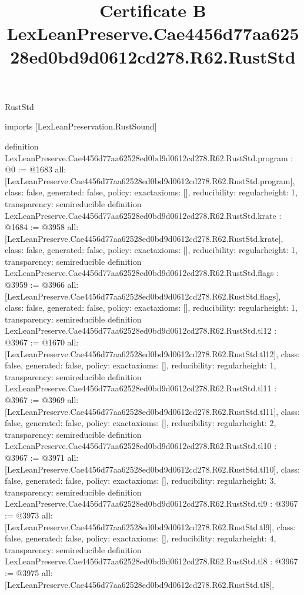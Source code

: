\begin{lexlean}{RustStd}
\title{Certificate B LexLeanPreserve.Cae4456d77aa62528ed0bd9d0612cd278.R62.RustStd}
\begin{coremodule}
imports [LexLeanPreservation.RustSound]

definition LexLeanPreserve.Cae4456d77aa62528ed0bd9d0612cd278.R62.RustStd.program : @0 := @1683 {
  all: [LexLeanPreserve.Cae4456d77aa62528ed0bd9d0612cd278.R62.RustStd.program],
  class: false,
  generated: false,
  policy: exact{axioms: []},
  reducibility: regular{height: 1},
  transparency: semireducible
}
definition LexLeanPreserve.Cae4456d77aa62528ed0bd9d0612cd278.R62.RustStd.krate : @1684 := @3958 {
  all: [LexLeanPreserve.Cae4456d77aa62528ed0bd9d0612cd278.R62.RustStd.krate],
  class: false,
  generated: false,
  policy: exact{axioms: []},
  reducibility: regular{height: 1},
  transparency: semireducible
}
definition LexLeanPreserve.Cae4456d77aa62528ed0bd9d0612cd278.R62.RustStd.flags : @3959 := @3966 {
  all: [LexLeanPreserve.Cae4456d77aa62528ed0bd9d0612cd278.R62.RustStd.flags],
  class: false,
  generated: false,
  policy: exact{axioms: []},
  reducibility: regular{height: 1},
  transparency: semireducible
}
definition LexLeanPreserve.Cae4456d77aa62528ed0bd9d0612cd278.R62.RustStd.tl12 : @3967 := @1670 {
  all: [LexLeanPreserve.Cae4456d77aa62528ed0bd9d0612cd278.R62.RustStd.tl12],
  class: false,
  generated: false,
  policy: exact{axioms: []},
  reducibility: regular{height: 1},
  transparency: semireducible
}
definition LexLeanPreserve.Cae4456d77aa62528ed0bd9d0612cd278.R62.RustStd.tl11 : @3967 := @3969 {
  all: [LexLeanPreserve.Cae4456d77aa62528ed0bd9d0612cd278.R62.RustStd.tl11],
  class: false,
  generated: false,
  policy: exact{axioms: []},
  reducibility: regular{height: 2},
  transparency: semireducible
}
definition LexLeanPreserve.Cae4456d77aa62528ed0bd9d0612cd278.R62.RustStd.tl10 : @3967 := @3971 {
  all: [LexLeanPreserve.Cae4456d77aa62528ed0bd9d0612cd278.R62.RustStd.tl10],
  class: false,
  generated: false,
  policy: exact{axioms: []},
  reducibility: regular{height: 3},
  transparency: semireducible
}
definition LexLeanPreserve.Cae4456d77aa62528ed0bd9d0612cd278.R62.RustStd.tl9 : @3967 := @3973 {
  all: [LexLeanPreserve.Cae4456d77aa62528ed0bd9d0612cd278.R62.RustStd.tl9],
  class: false,
  generated: false,
  policy: exact{axioms: []},
  reducibility: regular{height: 4},
  transparency: semireducible
}
definition LexLeanPreserve.Cae4456d77aa62528ed0bd9d0612cd278.R62.RustStd.tl8 : @3967 := @3975 {
  all: [LexLeanPreserve.Cae4456d77aa62528ed0bd9d0612cd278.R62.RustStd.tl8],
}
\end{coremodule}
\end{lexlean}
